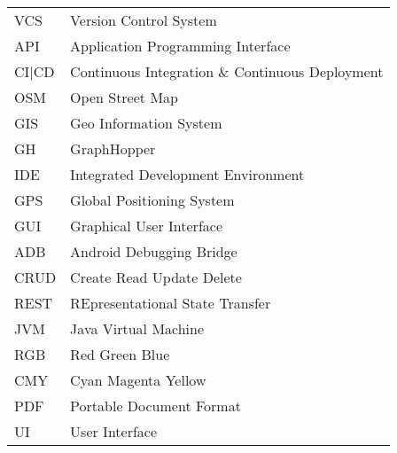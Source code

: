 \begin{singlespace}
\begin{flushleft}
\begin{longtable}{p{2 cm}p{14 cm}}
  VCS & Version Control System \\
  API & Application Programming Interface \\
  CI|CD & Continuous Integration \& Continuous Deployment \\
  OSM & Open Street Map \\
  GIS & Geo Information System \\
  GH & GraphHopper \\
  IDE & Integrated Development Environment \\
  GPS & Global Positioning System \\
  GUI & Graphical User Interface \\	
  ADB & Android Debugging Bridge \\
  CRUD & Create Read Update Delete \\
  REST & REpresentational State Transfer \\
  JVM & Java Virtual Machine \\
  RGB & Red Green Blue \\
  CMY & Cyan Magenta Yellow \\
  PDF & Portable Document Format \\
  UI & User Interface \\
\end{longtable}
\end{flushleft}
\end{singlespace}